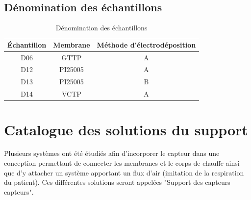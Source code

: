 \subsection{Dénomination des échantillons}
\begin{table}[H]
    \centering
    \begin{tabular}{|c|c|c|}
        \hline
        Échantillon & Membrane & Méthode d'électrodéposition \\
        \hline
        D06         & GTTP     & A                           \\
        \hline
        D12         & PI25005  & A                           \\
        \hline
        D13         & PI25005  & B                           \\
        \hline
        D14         & VCTP     & A                           \\
        \hline
    \end{tabular}
    \caption{Dénomination des échantillons}
\end{table}

\newpage
\section{Catalogue des solutions du support}
\label{chap:catalogueSol}
Plusieurs systèmes ont été étudiés afin d'incorporer le capteur dans une conception permettant de connecter les membranes et le corps de chauffe
ainsi que d'y attacher un système apportant un flux d'air (imitation de la respiration du patient). Ces différentes solutions seront appelées
"Support des capteurs \gls{capteur}s".

